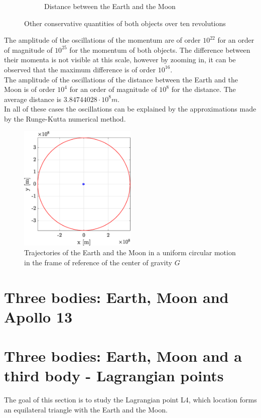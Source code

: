 \documentclass[a4paper,12pt,twoside]{article}
\begin{document}
\begin{figure}[h]
\begin{subfigure}[t]{0.48\textwidth}
    \caption{Distance between the Earth and the Moon}
    \label{fig:4d}
  \end{subfigure}
  \caption{Other conservative quantities of both objects over ten revolutions}
  \label{fig:4cons}
\end{figure}

The amplitude of the oscillations of the momentum are of order $10^{22}$ for an order of magnitude of $10^{25}$ for the momentum of both objects. The difference between their momenta is not visible at this scale, however by zooming in, it can be observed that the maximum difference is of order $10^{16}$.\\
The amplitude of the oscillations of the distance between the Earth and the Moon is of order $10^4$ for an order of magnitude of $10^8$ for the distance. The average distance is $3.84744028 \cdot 10^8 m$.\\
In all of these cases the oscillations can be explained by the approximations made by the Runge-Kutta numerical method.

\begin{figure}[h]
  \centering
  \includegraphics[width=0.5\textwidth]{graphs/ex4_traj.eps}
  \caption{Trajectories of the Earth and the Moon in a uniform circular motion in the frame of reference of the center of gravity $G$}
  \label{fig:4_traj}
\end{figure}

\section{Three bodies: Earth, Moon and Apollo 13}

\section{Three bodies: Earth, Moon and a third body - Lagrangian points}
The goal of this section is to study the Lagrangian point L4, which location forms an equilateral triangle with the Earth and the Moon.
\end{document}
